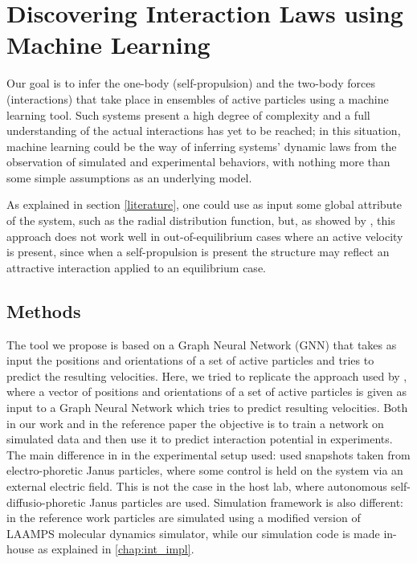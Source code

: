 \documentclass[../../master_thesis_np.tex]{subfiles}
\begin{document}
\chapter{Discovering Interaction Laws using Machine Learning}
Our goal is to infer the one-body (self-propulsion) and the two-body forces (interactions) that take place in ensembles of active particles using a machine learning tool.
Such systems present a high degree of complexity and a full understanding of the actual interactions has yet to be reached; in this situation, machine learning could be the way of inferring systems' dynamic laws from the observation of simulated and experimental behaviors, with nothing more than some simple assumptions as an underlying model.

As explained in section \ref{literature}, one could use as input some global attribute of the system, such as the radial distribution function, but, as showed by \citeauthor{bag_interaction_2021}, this approach does not work well in out-of-equilibrium cases where an active velocity is present, since when a self-propulsion is present the structure may reflect an attractive interaction applied to an equilibrium case.

\section{Methods}
The tool we propose is based on a Graph Neural Network (GNN) that takes as input the positions and orientations of a set of active particles and tries to predict the resulting velocities.
Here, we tried to replicate the approach used by \citeauthor{ruiz-garcia_discovering_2024}, where a vector of positions and orientations of a set of active particles is given as input to a Graph Neural Network which tries to predict resulting velocities.
Both in our work and in the reference paper the objective is to train a network on simulated data and then use it to predict interaction potential in experiments.
The main difference in in the experimental setup used: \citeauthor{ruiz-garcia_discovering_2024} used snapshots taken from electro-phoretic Janus particles, where some control is held on the system via an external electric field.
This is not the case in the host lab, where autonomous self-diffusio-phoretic Janus particles are used.
Simulation framework is also different: in the reference work particles are simulated using a modified version of LAAMPS \cite{thompson_lammps_2022} molecular dynamics simulator, while our simulation code is made in-house as explained in \ref{chap:int_impl}.
\end{document}

